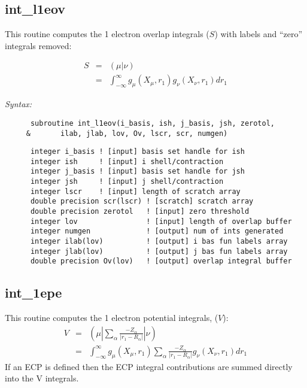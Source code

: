 \subsection{int\_l1eov} 
This routine computes the 1 electron overlap integrals ($S$) 
with labels and ``zero'' integrals removed: 
 
\begin{eqnarray*} 
S & = & ({\mu}|{\nu}) \\ 
  & = & \int_{-\infty}^{\infty} g_{\mu}(X_{\mu},r_{1})g_{\nu}(X_{\nu},r_{1})dr_{1} 
\end{eqnarray*} 
 
{\it Syntax:} 
\begin{verbatim} 
      subroutine int_l1eov(i_basis, ish, j_basis, jsh, zerotol, 
     &       ilab, jlab, lov, Ov, lscr, scr, numgen)  
\end{verbatim} 
\begin{verbatim} 
      integer i_basis ! [input] basis set handle for ish 
      integer ish     ! [input] i shell/contraction 
      integer j_basis ! [input] basis set handle for jsh 
      integer jsh     ! [input] j shell/contraction 
      integer lscr    ! [input] length of scratch array 
      double precision scr(lscr) ! [scratch] scratch array 
      double precision zerotol   ! [input] zero threshold 
      integer lov                ! [input] length of overlap buffer 
      integer numgen             ! [output] num of ints generated 
      integer ilab(lov)          ! [output] i bas fun labels array 
      integer jlab(lov)          ! [output] j bas fun labels array 
      double precision Ov(lov)   ! [output] overlap integral buffer 
\end{verbatim} 
\subsection{int\_1epe} 
This routine computes the 1 electron potential integrals, ($V$): 
\begin{eqnarray*} 
V & = & ({\mu}|\sum_{\alpha}\frac{-Z_{\alpha}}{|r_{1}-R_{\alpha}|}|{\nu}) \\ 
  & = & \int_{-\infty}^{\infty} g_{\mu}(X_{\mu},r_{1})\sum_{\alpha}\frac 
{-Z_{\alpha}}{|r_{1}-R_{\alpha}|}g_{\nu}(X_{\nu},r_{1})dr_{1}  
\end{eqnarray*} 
If an ECP is defined then the ECP integral contributions are summed  
directly into the V integrals.   
 
